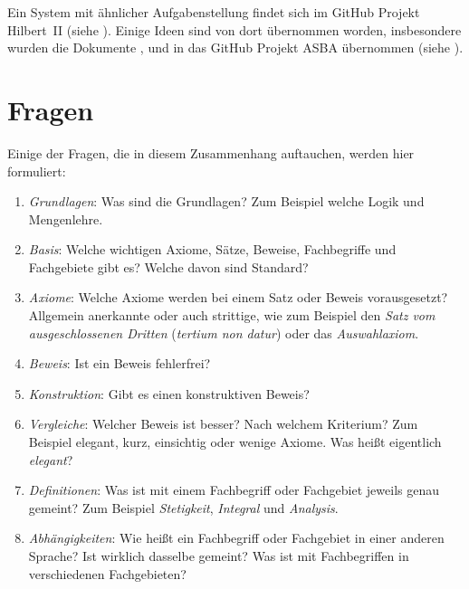 \documentclass[english,ngerman,parskip=half,headsepline,footsepline]{scrreprt}
\begin{document}
	Ein System mit ähnlicher Aufgabenstellung findet sich im GitHub Projekt Hilbert~II (siehe \cite{HilbertII,qedeq}). Einige Ideen sind von dort übernommen worden, insbesondere wurden die Dokumente \cite{Logik}, \cite{FLogik} und \cite{Mengenlehre} in das GitHub Projekt ASBA übernommen (siehe \cite{ASBA}).
	
	\section{Fragen}
	\label{sec:Fragen}
	Einige der Fragen, die in diesem Zusammenhang auftauchen, werden hier formuliert:
	
	\begin{enumerate}
		
		\item \label{Frage:Grundlagen} \emph{Grundlagen}: Was sind die Grundlagen? Zum Beispiel welche Logik und Mengenlehre.
		
		\item \label{Frage:Basis} \emph{Basis}: Welche wichtigen Axiome, Sätze, Beweise, Fachbegriffe und Fachgebiete gibt es? Welche davon sind Standard?
		
		\item \label{Frage:Axiome} \emph{Axiome}: Welche Axiome werden bei einem Satz oder Beweis vorausgesetzt? Allgemein anerkannte oder auch strittige, wie zum Beispiel den \emph{Satz vom ausgeschlossenen Dritten} (\emph{tertium non datur}) oder das \emph{Auswahlaxiom}.
		
		\item \label{Frage:Beweis} \emph{Beweis}: Ist ein Beweis fehlerfrei?
		
		\item \label{Frage:Konstruktion} \emph{Konstruktion}: Gibt es einen konstruktiven Beweis?
		
		\item \label{Frage:Vergleiche} \emph{Vergleiche}: Welcher Beweis ist besser? Nach welchem Kriterium? Zum Beispiel elegant, kurz, einsichtig oder wenige Axiome. Was heißt eigentlich \emph{elegant}?
		
		\item \label{Frage:Definitionen} \emph{Definitionen}: Was ist mit einem Fachbegriff oder Fachgebiet jeweils genau gemeint? Zum Beispiel \emph{Stetigkeit}, \emph{Integral} und \emph{Analysis}.
		
		\item \label{Frage:Abhängigkeiten} \emph{Abhängigkeiten}: Wie heißt ein Fachbegriff oder Fachgebiet in einer anderen Sprache? Ist wirklich dasselbe gemeint? Was ist mit Fachbegriffen in verschiedenen Fachgebieten?
		

\end{enumerate}
\end{document}
